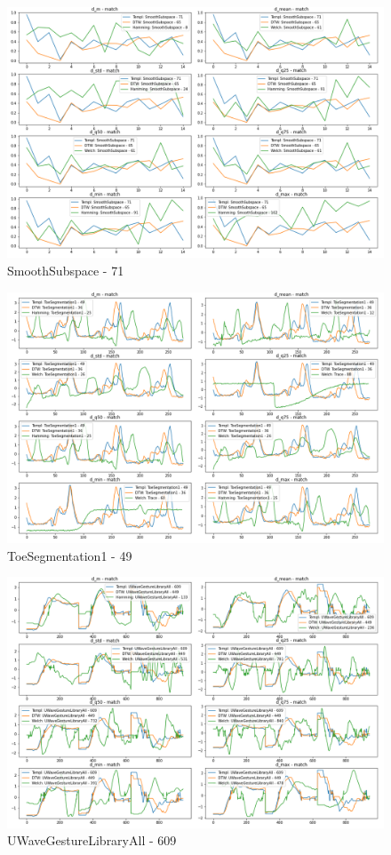 \documentclass[phd,black, hidelinks]{PrincetonThesis}
\begin{document}
\begin{figure}[htbp]
\centering
\includegraphics[width=.9\linewidth]{./img/dtw_comp_res/SmoothSubspace_71.png}
\caption{\label{fig:orgc2af2a3}SmoothSubspace - 71}
\end{figure}

\begin{figure}[htbp]
\centering
\includegraphics[width=.9\linewidth]{./img/dtw_comp_res/ToeSegmentation1_49.png}
\caption{\label{fig:orgd500ca2}ToeSegmentation1 - 49}
\end{figure}

\begin{figure}[htbp]
\centering
\includegraphics[width=.9\linewidth]{./img/dtw_comp_res/UWaveGestureLibraryAll_609.png}
\caption{\label{fig:orgec6077e}UWaveGestureLibraryAll - 609}
\end{figure}
\end{document}
